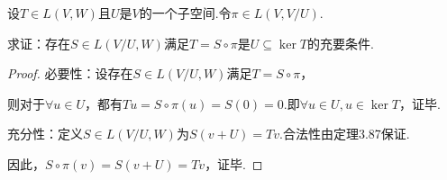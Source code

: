 \begin{comment}
    \begin{problem}[18]\label{3.E.18}
        设\(U\)是\(V\)的一个子空间且\(V/U\)是有限维向量空间.

        求证：存在\(V\)的另一个子空间\(W\)，使得\(\dim W=\dim V/U\)且\(V=U \oplus W\).
    \end{problem}

    \begin{proof}
        由于\(V/U\)是有限维向量空间，设\(v_1+U,\cdots,v_m+U\)是\(V/U\)的一组基.

        从而\(\forall v+U \in V/U,v+U=\sum_{i=1}^m a_i(v_i+U)=\sum_{i=1}^m a_iv_i+U\).
        
        即\(v-\sum_{i=1}^m a_iv_i=u \in U,v=\sum_{i=1}^m a_iv_i+u\)，得到\(V=\altspan (v_1,\cdots,v_m)+U\).
        
        下证\(v_1,\cdots,v_m\)线性无关且\(\altspan (v_1,\cdots,v_m) \cap U =\{0\}\).
        
        \(\sum_{i=1}^m a_i(v_i+U)=\sum_{i=1}^m a_iv_i+U=U \Rightarrow a_1=\cdots=a_m=0\)，即\(v_1,\cdots,v_m\)线性无关.
        
        使用反证法.若\(v_0 \ne 0 \in \altspan (v_1,\cdots,v_m) \cap U\)，
        即存在至少一个\(a_i \ne 0\)，使得\(v_0=\sum_{i=1}^m a_iv_i\).
        
        然而\(v_0 \in U \Rightarrow v_0+U=U \Rightarrow a_1=\cdots=a_m=0\).
        
        矛盾，假设不成立，令\(W=\altspan (v_1,\cdots,v_m)\)，原命题即得证.
    \end{proof}
\end{comment}

\begin{problem}[19]\label{3.E.19}
    设\(T \in L(V,W)\)且\(U\)是\(V\)的一个子空间.令\(\pi \in L(V,V/U)\).

    求证：存在\(S \in L(V/U,W)\)满足\(T=S \circ \pi\)是\(U \subseteq \ker T\)的充要条件.
\end{problem}

\begin{proof}
    必要性：设存在\(S \in L(V/U,W)\)满足\(T=S \circ \pi\)，

    则对于\(\forall u \in U\)，都有\(Tu=S \circ \pi(u)=S(0)=0\).即\(\forall u \in U,u \in \ker T\)，证毕.
    
    充分性：定义\(S \in L(V/U,W)\)为\(S(v+U)=Tv\).合法性由定理3.87保证.
    
    因此，\(S \circ \pi(v)=S(v+U)=Tv\)，证毕.
\end{proof}

